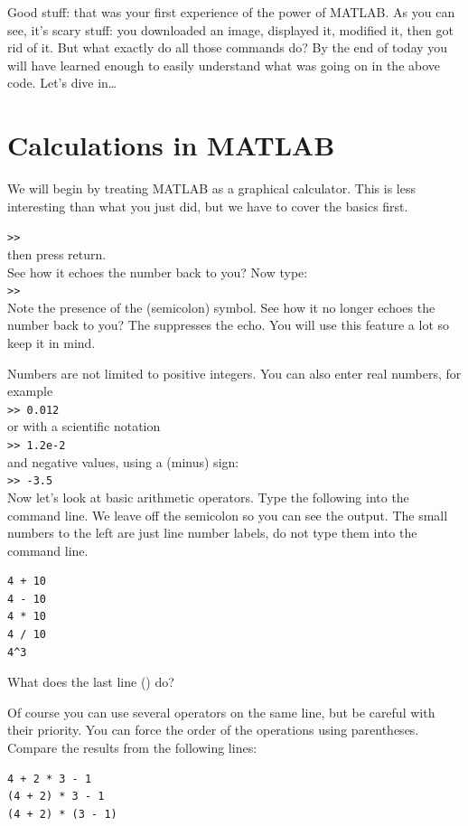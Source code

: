 \documentclass{article}
\begin{document}
Good stuff: that was your first experience of the power of MATLAB.
As you can see, it's  scary stuff: you downloaded an image, displayed it, modified it, then got rid of it.
But what exactly do all those commands do?
By the end of today you will have learned enough to easily understand what was going on in the above code.
Let's dive in\ldots

\pagebreak
\section{Calculations in MATLAB}

We will begin by treating MATLAB as a graphical calculator.
This is less interesting than what you just did, but we have to cover the basics first.

\verb|>>|  \\
then press return. \\
See how it echoes the number back to you? Now type: \\
\verb|>>|  \\
Note the presence of the \mcode{;} (semicolon) symbol.
See how it no longer echoes the number back to you?
The \mcode{;} suppresses the echo.
You will use this feature a lot so keep it in mind.

Numbers are not limited to positive integers.
You can also enter real numbers, for example \\
\verb|>> 0.012| \\
or with a scientific notation \\
\verb|>> 1.2e-2| \\
and negative values, using a \mcode{-} (minus) sign:\\
\verb|>> -3.5| \\

Now let's look at basic arithmetic operators.
Type the following into the command line.
We leave off the semicolon so you can see the output.
The small numbers to the left are just line number labels, do not type them into the command line.

\begin{lstlisting}
4 + 10
4 - 10
4 * 10
4 / 10
4^3
\end{lstlisting}
What does the last line () do?

Of course you can use several operators on the same line, but be careful with their priority.
You can force the order of the operations using parentheses.
Compare the results from the following lines:
\begin{lstlisting}
4 + 2 * 3 - 1
(4 + 2) * 3 - 1
(4 + 2) * (3 - 1)
\end{lstlisting}
\end{document}
